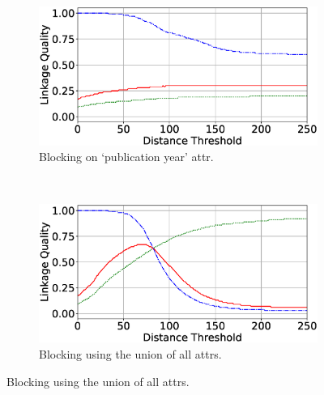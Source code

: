 \documentclass{llncs}
\begin{document}
\begin{figure}
\begin{subfigure}{.47\textwidth}
  \centering
\includegraphics[width=\textwidth]{figures/plotLQ-cora-trad-year}
\vspace{-6mm}
\caption{Blocking on `publication year' attr.}
\end{subfigure}%
~~
\begin{subfigure}{.47\textwidth}
  \centering
\includegraphics[width=\textwidth]{figures/plotLQ-cora-trad-combined}
\vspace{-6mm}
\caption{Blocking using the union of all attrs.}
\end{subfigure} \vspace{3mm}


\end{figure}
\end{document}
